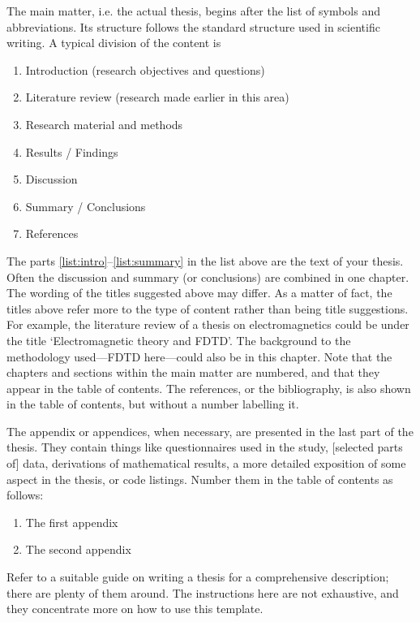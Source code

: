 \documentclass[english, 12pt, a4paper, elec, utf8, a-2b, online]{aaltothesis}
\begin{document}
The main matter, i.e. the actual thesis, begins after the list of symbols and 
abbreviations. Its structure follows the standard structure used in scientific 
writing. A typical division of the content is
\begin{enumerate}
	\item \label{list:intro} Introduction (research objectives and questions)
	\item Literature review (research made earlier in this area)
	\item Research material and methods
	\item Results / Findings
	\item Discussion
	\item \label{list:summary} Summary / Conclusions
	\item References
\end{enumerate}
The parts \ref{list:intro}--\ref{list:summary} in the list above are the text  
of your thesis. Often the discussion and summary (or conclusions) are combined 
in one chapter. The wording of the titles suggested above may differ. As a 
matter of fact, the titles above refer more to the type of content rather than 
being title suggestions. For example, the literature review of a thesis on 
electromagnetics could be under the title ‘Electromagnetic theory and FDTD’. 
The background to the methodology used---FDTD here---could also be in this 
chapter. Note that the chapters and sections within the main matter are 
numbered, and that they appear in the table of contents. The references, or the 
bibliography, is also shown in the table of contents, but without a number 
labelling it.

The appendix or appendices, when necessary, are presented in the last part of
the thesis. They contain things like questionnaires used in the study, 
[selected parts of] data, derivations of mathematical results, a more detailed 
exposition of some aspect in the thesis, or code listings. Number them in the 
table of contents as follows:
\begin{enumerate}
\renewcommand{\labelenumi}{\Alph{enumi}.}
	\item The first appendix
	\item The second appendix
\end{enumerate}

Refer to a suitable guide on writing a thesis for a comprehensive description;
there are plenty of them around. The instructions here are not exhaustive, and
they concentrate more on how to use this template.
\end{document}
